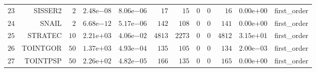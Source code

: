 \begin{longtable}{rrrrrrrrrrrr}
  \(    23\) & SISSER2 & \(     2\) & \( 2.48\)e\(-08\) & \( 8.06\)e\(-06\) & \(    17\) & \(    15\) & \(     0\) & \(     0\) & \(    16\) & \( 0.00\)e\(+00\) & first\_order \\
  \(    24\) & SNAIL & \(     2\) & \( 6.68\)e\(-12\) & \( 5.17\)e\(-06\) & \(   142\) & \(   108\) & \(     0\) & \(     0\) & \(   141\) & \( 0.00\)e\(+00\) & first\_order \\
  \(    25\) & STRATEC & \(    10\) & \( 2.21\)e\(+03\) & \( 4.06\)e\(-02\) & \(  4813\) & \(  2273\) & \(     0\) & \(     0\) & \(  4812\) & \( 3.15\)e\(+01\) & first\_order \\
  \(    26\) & TOINTGOR & \(    50\) & \( 1.37\)e\(+03\) & \( 4.93\)e\(-04\) & \(   135\) & \(   105\) & \(     0\) & \(     0\) & \(   134\) & \( 2.00\)e\(-03\) & first\_order \\
  \(    27\) & TOINTPSP & \(    50\) & \( 2.26\)e\(+02\) & \( 4.82\)e\(-05\) & \(   166\) & \(   135\) & \(     0\) & \(     0\) & \(   165\) & \( 0.00\)e\(+00\) & first\_order \\\hline
\end{longtable}
